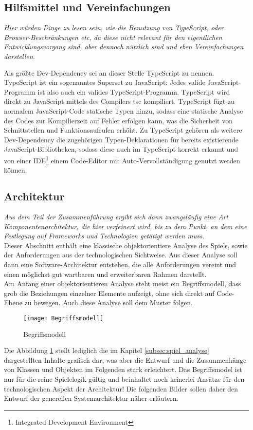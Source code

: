 \subsection{Hilfsmittel und Vereinfachungen}
\label{subsec:Hilfsmittel}

\emph{Hier würden Dinge zu lesen sein, wie die Benutzung von TypeScript, oder Browser-Beschränkungen etc, da diese nicht relevant für den eigentlichen Entwicklungsvorgang sind, aber dennoch nützlich sind und eben Vereinfachungen darstellen.}

Als größte Dev-Dependency sei an dieser Stelle TypeScript zu nennen. TypeScript ist ein sogenanntes Superset zu JavaScript: Jedes valide JavaScript-Programm ist also auch ein valides TypeScript-Programm. TypeScript wird direkt zu JavaScript mittels des Compilers tsc kompiliert. TypeScript fügt zu normalem JavaScript-Code statische Typen hinzu, sodass eine statische Analyse des Codes zur Kompilierzeit auf Fehler erfolgen kann, was die Sicherheit von Schnittstellen und Funktionsaufrufen erhöht. Zu TypeScript gehören als weitere Dev-Dependency die zugehörigen Typen-Deklarationen für bereits existierende JavaScript-Bibliotheken, sodass diese auch im TypeScript korrekt erkannt und von einer IDE\footnote{Integrated Development Environment} \bzw einem Code-Editor mit Auto-Vervollständigung genutzt werden können.
\subsection{Architektur}
\label{subsec:Architektur}

\emph{Aus dem Teil der Zusammenführung ergibt sich dann zwangsläufig eine Art Komponentenarchitektur, die hier verfeinert wird, bis zu dem Punkt, an dem eine Festlegung auf Frameworks und Technologien getätigt werden muss.}\\
Dieser Abschnitt enthält eine klassische objektorientiere Analyse des Spiels, sowie der Anforderungen aus der technologischen Sichtweise. Aus dieser Analyse soll dann eine Software-Architektur entstehen, die alle Anforderungen vereint und einen möglichst gut wartbaren und erweiterbaren Rahmen darstellt.\\
Am Anfang einer objektorientieren Analyse steht meist ein Begriffsmodell, dass grob die Beziehungen einzelner Elemente aufzeigt, ohne sich direkt auf Code-Ebene zu bewegen. Auch diese Analyse soll dem Muster folgen. 
\begin{figure}[h]
	\centering
	\captionsetup{justification=centering}
	\texttt{[image: Begriffsmodell]}
	\caption[Begriffsmodell]{Begriffsmodell}
	\label{fig:Begriffsmodell}
\end{figure}
Die Abbildung \ref{fig:Begriffsmodell} stellt lediglich die im Kapitel \ref{subsec:spiel_analyse} dargestellten Inhalte grafisch dar, was aber die Entwurf und die Zusammenhänge von Klassen und Objekten im Folgenden stark erleichtert. Das Begriffsmodel ist nur für die reine Spielelogik gültig und beinhaltet noch keinerlei Ansätze für den technologischen Aspekt der Architektur! Die folgenden Bilder sollen daher den Entwurf der generellen Systemarchitektur näher erläutern.

